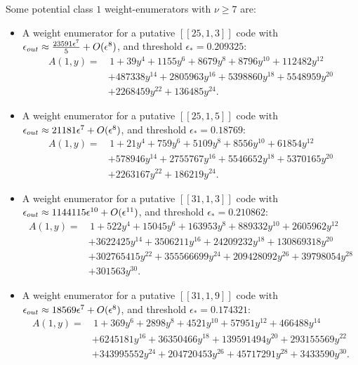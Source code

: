 \documentclass[11pt]{article}
\begin{document}
Some potential class $1$ weight-enumerators with $\nu \geq 7$ are:
\begin{itemize}
    \item A weight enumerator for a putative $[[25,1,3]]$ code with $\epsilon_{\rm out} \approx  \frac{23591 \epsilon ^7}{5} +O(\epsilon^8)$, and threshold $\epsilon_*=0.209325 $:
\begin{equation}
\begin{aligned}
    A(1, y) = & \, 1 + 39y^4 + 1155y^6 + 8679y^8 + 8796y^{10} + 112482y^{12} \\
              & + 487338y^{14} + 2805963y^{16} + 5398860y^{18} + 5548959y^{20} \\
              & + 2268459y^{22} + 136485y^{24}.
\end{aligned}
\end{equation}

       \item A weight enumerator for a putative $[[25,1,5]]$ code with $\epsilon_{\rm out} \approx  21181 \epsilon ^7 +O(\epsilon^8)$, and threshold $\epsilon_*=0.18769  $:
\begin{equation}
\begin{aligned}
    A(1, y) = & \, 1 + 21y^4 + 759y^6 + 5109y^8 + 8556y^{10} + 61854y^{12} \\
              & + 578946y^{14} + 2755767y^{16} + 5546652y^{18} + 5370165y^{20} \\
              & + 2263167y^{22} + 186219y^{24}.
\end{aligned}
\end{equation}


    \item A weight enumerator for a putative $[[31,1,3]]$ code with $\epsilon_{\rm out} \approx  {1144115 \epsilon ^{10}} +O(\epsilon^{11})$, and threshold $\epsilon_*=0.210862$:
\begin{equation}
\begin{aligned}
    A(1, y) = & \, 1 + 522y^4 + 15045y^6 + 163953y^8 + 889332y^{10} + 2605962y^{12} \\
              & + 3622425y^{14} + 3506211y^{16} + 24209232y^{18} + 130869318y^{20} \\
              & + 302765415y^{22} + 355566699y^{24} + 209428092y^{26} + 39798054y^{28} \\
              & + 301563y^{30}.
\end{aligned}
\end{equation}
    
    \item A weight enumerator for a putative $[[31,1,9]]$ code with $\epsilon_{\rm out} \approx  {18569 \epsilon ^7} +O(\epsilon^8)$, and threshold $\epsilon_*=0.174321 $:
 \begin{equation}
\begin{aligned}
    A(1, y) = & \, 1 + 369y^6 + 2898y^8 + 4521y^{10} + 57951y^{12} + 466488y^{14} \\
              & + 6245181y^{16} + 36350466y^{18} + 139591494y^{20} + 293155569y^{22} \\
              & + 343995552y^{24} + 204720453y^{26} + 45717291y^{28} + 3433590y^{30}.
\end{aligned}
\end{equation}


\end{itemize}
\end{document}
